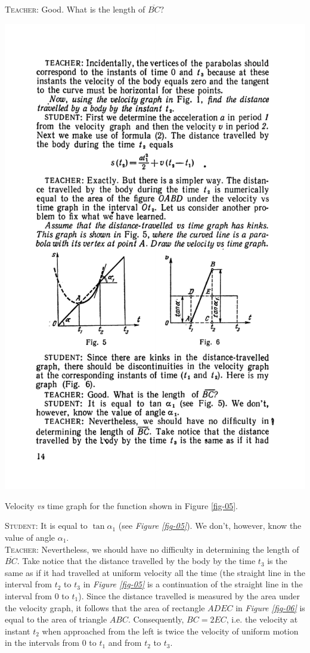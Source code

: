 \documentclass[a4paper,sfsidenotes]{tufte-book}
\begin{document}
\textsc{Teacher:} Good. What is the length of $\overline{BC}$?\\
\begin{marginfigure}
\centering
\includegraphics[width=1.1\linewidth]{fig-006a.pdf}
\caption{Velocity \emph{vs} time graph for the function shown in Figure \ref{fig-05}.}
\label{fig-06}
\end{marginfigure}
\textsc{Student:} It is equal to $\tan \alpha_{1}$ (see \emph{Figure \ref{fig-05}}). We don't, however, know the value of angle $\alpha_{1}$.\\
\textsc{Teacher:} Nevertheless, we should have no difficulty in determining the length of $\overline{BC}$. Take notice that the distance travelled by the body by the time $t_{3}$ is the same as if it had travelled at uniform velocity all the time (the straight line in the interval from $t_{2}$ to $t_{3}$ in \emph{Figure \ref{fig-05}} is a continuation of the straight line in the interval from 0 to $t_{1}$). Since the distance travelled is measured by the area under the velocity graph, it follows that the area of rectangle $ADEC$ in \emph{Figure \ref{fig-06}} is equal to the area of triangle $ABC$. Consequently, $BC=2EC$, i.e. the velocity at instant $t_{2}$ when approached from the left is twice the velocity of uniform motion in the intervals from 0 to $t_{1}$ and from $t_{2}$ to $t_{3}$.
\end{document}
